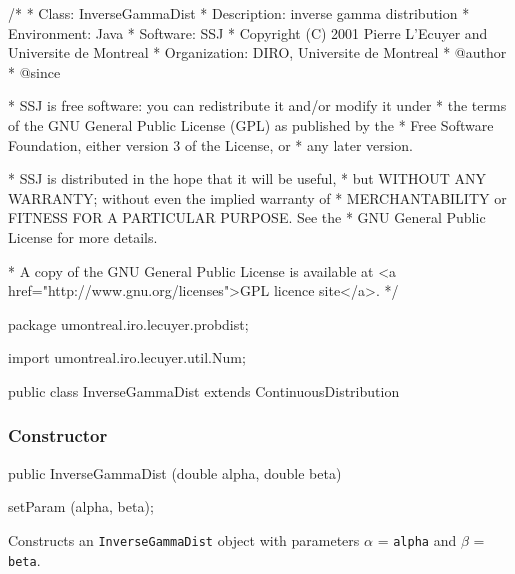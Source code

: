 \begin{code}
\begin{hide}
/*
 * Class:        InverseGammaDist
 * Description:  inverse gamma distribution
 * Environment:  Java
 * Software:     SSJ 
 * Copyright (C) 2001  Pierre L'Ecuyer and Universite de Montreal
 * Organization: DIRO, Universite de Montreal
 * @author       
 * @since

 * SSJ is free software: you can redistribute it and/or modify it under
 * the terms of the GNU General Public License (GPL) as published by the
 * Free Software Foundation, either version 3 of the License, or
 * any later version.

 * SSJ is distributed in the hope that it will be useful,
 * but WITHOUT ANY WARRANTY; without even the implied warranty of
 * MERCHANTABILITY or FITNESS FOR A PARTICULAR PURPOSE.  See the
 * GNU General Public License for more details.

 * A copy of the GNU General Public License is available at
   <a href="http://www.gnu.org/licenses">GPL licence site</a>.
 */
\end{hide}
package umontreal.iro.lecuyer.probdist;
\begin{hide}
import umontreal.iro.lecuyer.util.Num;
\end{hide}

public class InverseGammaDist extends ContinuousDistribution\begin{hide} {
   protected double alpha;
   protected double beta;
   protected double logam;   // Ln (Gamma(alpha))

\end{hide}\end{code}
\subsubsection* {Constructor}

\begin{code}

   public InverseGammaDist (double alpha, double beta)\begin{hide} {
      setParam (alpha, beta);
   }\end{hide}
\end{code}
\begin{tabb}
   Constructs an \texttt{InverseGammaDist} object with parameters
   $\alpha$ = \texttt{alpha} and $\beta$ = \texttt{beta}.
\end{tabb}

